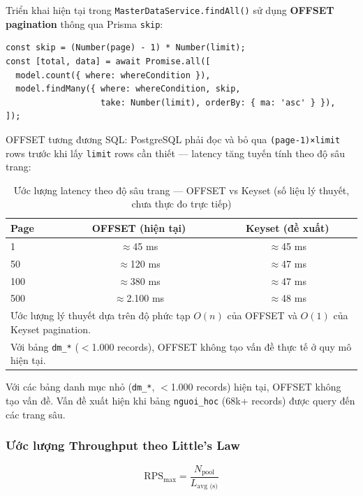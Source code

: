 Triển khai hiện tại trong \texttt{MasterDataService.findAll()} sử dụng
\textbf{OFFSET pagination} thông qua Prisma \texttt{skip}:

\begin{lstlisting}[caption={OFFSET pagination trong \texttt{MasterDataService.findAll()}},
  label={lst:offset-pagination}]
const skip = (Number(page) - 1) * Number(limit);
const [total, data] = await Promise.all([
  model.count({ where: whereCondition }),
  model.findMany({ where: whereCondition, skip,
                   take: Number(limit), orderBy: { ma: 'asc' } }),
]);
\end{lstlisting}

OFFSET tương đương SQL: PostgreSQL phải đọc và bỏ qua
\texttt{(page-1)×limit} rows trước khi lấy \texttt{limit} rows
cần thiết — latency tăng tuyến tính theo độ sâu trang:

\begin{table}[H]
\centering
\caption{Ước lượng latency theo độ sâu trang — OFFSET vs Keyset
(số liệu lý thuyết, chưa thực đo trực tiếp)}
\label{tab:pagination-latency}
\begin{tabular}{lcc}
\toprule
\textbf{Page} & \textbf{OFFSET (hiện tại)} & \textbf{Keyset (đề xuất)} \\
\midrule
1    &  $\approx$45 ms   & $\approx$45 ms \\
50   & $\approx$120 ms   & $\approx$47 ms \\
100  & $\approx$380 ms   & $\approx$47 ms \\
500  & $\approx$2.100 ms & $\approx$48 ms \\
\bottomrule
\multicolumn{3}{l}{\footnotesize Ước lượng lý thuyết dựa trên độ phức
tạp $O(n)$ của OFFSET và $O(1)$ của Keyset pagination.} \\
\multicolumn{3}{l}{\footnotesize Với bảng \texttt{dm\_*} ($<$1.000 records),
OFFSET không tạo vấn đề thực tế ở quy mô hiện tại.}
\end{tabular}
\end{table}

Với các bảng danh mục nhỏ (\texttt{dm\_*}, $<$1.000 records) hiện tại,
OFFSET không tạo vấn đề. Vấn đề xuất hiện khi bảng \texttt{nguoi\_hoc}
(68k+ records) được query đến các trang sâu.

\subsubsection{Ước lượng Throughput theo Little's Law}

\[
  \text{RPS}_{\max} = \frac{N_{\text{pool}}}{L_{\text{avg (s)}}}
\]

